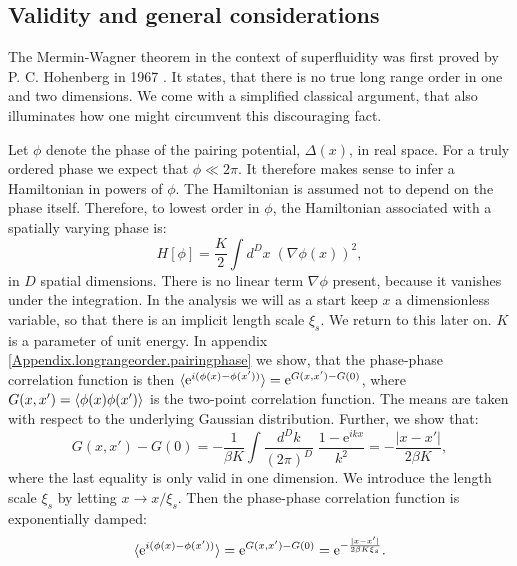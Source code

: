 \subsection{Validity and general considerations} \label{subsec.meanfieldvalidity.general}
The Mermin-Wagner theorem in the context of superfluidity was first proved by P. C. Hohenberg in 1967 \cite{Hohenberg.MerminWagnertheorem}. It states, that there is no true long range order in one and two dimensions. We come with a simplified classical argument, that also illuminates how one might circumvent this discouraging fact. 

Let $\phi$ denote the phase of the pairing potential, $\Delta(x)$, in real space. For a truly ordered phase we expect that $\phi \ll 2\pi$. It therefore makes sense to infer a Hamiltonian in powers of $\phi$. The Hamiltonian is assumed not to depend on the phase itself. Therefore, to lowest order in $\phi$, the Hamiltonian associated with a spatially varying phase is: 
\begin{equation}
H[\phi] = \frac{K}{2}\int d^{D}x \; \left(\nabla \phi(x)\right)^2, 
\label{eq.Hphi.maintext}
\end{equation}
in $D$ spatial dimensions. There is no linear term $\nabla \phi$ present, because it vanishes under the integration. In the analysis we will as a start keep $x$ a dimensionless variable, so that there is an implicit length scale $\xi_s$. We return to this later on. $K$ is a parameter of unit energy. In appendix \ref{Appendix.longrangeorder.pairingphase} we show, that the phase-phase correlation function is then $\braket{ \text{e}^{i(\phi(x)- \phi(x'))} } = \text{e}^{G(x,x') - G(0)}$, where $G(x,x') = \braket{\phi(x)\phi(x')}$ is the two-point correlation function. The means are taken with respect to the underlying Gaussian distribution. Further, we show that:
\begin{equation}
G(x,x') - G(0) = -\frac{1}{\beta K}\int \frac{d^{D}k}{(2\pi)^D}\; \frac{1 - \text{e}^{ikx}}{k^2} = -\frac{|x - x'|}{2\beta K}, \nonumber 
\end{equation}
where the last equality is only valid in one dimension. We introduce the length scale $\xi_s$ by letting $x \to x / \xi_s$. Then the phase-phase correlation function is exponentially damped: 
\begin{equation}
\braket{ \text{e}^{i(\phi(x)- \phi(x'))} } = \text{e}^{G(x,x') - G(0)} = \text{e}^{-\frac{|x - x'|}{2\beta K \xi_s}}. 
\label{eq.phasecorrelationfunction.onedimension.maintext} 
\end{equation}
